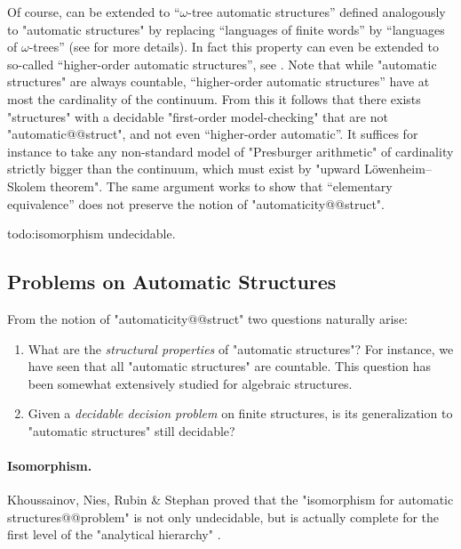 Of course,  can be extended
to ``$\omega$-tree automatic structures'' defined analogously to "automatic structures" by
replacing ``languages of finite words'' by ``languages of $\omega$-trees''
(see \cite[\S~XII]{Blumensath2024MSOModelTheory} for more details).
In fact this property can even be extended to so-called
``higher-order automatic structures'', see
\cite[last remark of \S~XII.2]{Blumensath2024MSOModelTheory}.
Note that while "automatic structures" are always countable,
``higher-order automatic structures'' have at most the cardinality of the continuum.%
From this it follows that there exists "structures" with a decidable "first-order model-checking" that are not "automatic@@struct", and not even ``higher-order automatic''.
It suffices for instance to take any non-standard model of "Presburger arithmetic"
of cardinality strictly bigger than the continuum, which must exist by
"upward Löwenheim–Skolem theorem". The same argument works to show that ``elementary equivalence''
does not preserve the notion of "automaticity@@struct".

todo:isomorphism undecidable.

\subsection{Problems on Automatic Structures}

From the notion of "automaticity@@struct" two questions naturally arise:
\begin{enumerate}
	\item What are the \emph{structural properties} of "automatic structures"?
		For instance, we have seen that all "automatic structures" are countable.
		This question has been somewhat extensively studied for algebraic structures.
	\item Given a \emph{decidable decision problem} on finite structures, is its generalization
		to "automatic structures" still decidable?
\end{enumerate}

\paragraph*{Isomorphism.}
Khoussainov, Nies, Rubin \& Stephan proved that the "isomorphism for automatic structures@@problem"
is not only undecidable, but is actually complete for the first level
of the "analytical hierarchy" \cite[Theorem~5.9]{KhoussainovNiesRubinStephan2007Automatic}.

